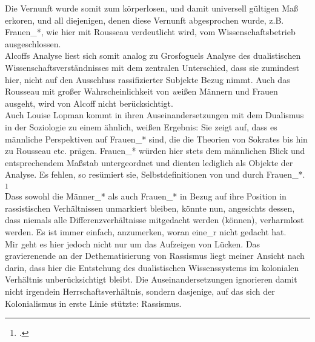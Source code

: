 Die Vernunft wurde somit zum körperlosen, und damit universell gültigen Maß
erkoren, und all diejenigen, denen diese Vernunft abgesprochen wurde, z.B.
Frauen\_*, wie hier mit Rousseau verdeutlicht wird, vom Wissenschaftsbetrieb
ausgeschlossen. \\
Alcoffs Analyse liest sich somit analog zu Grosfoguels Analyse
des dualistischen Wissenschaftsverständnisses mit dem zentralen Unterschied,
dass sie zumindest hier, nicht auf den Ausschluss rassifizierter Subjekte Bezug
nimmt. Auch das Rousseau mit großer Wahrscheinlichkeit von \textit{w}eißen Männern und
Frauen ausgeht, wird von Alcoff nicht berücksichtigt.\\ 

Auch Louise Lopman kommt in
ihren Auseinandersetzungen mit dem Dualismus in der Soziologie zu einem
ähnlich, weißen Ergebnis: Sie zeigt auf, dass es männliche Perspektiven auf
Frauen\_* sind, die die Theorien von Sokrates bis hin zu Rousseau etc. prägen.
Frauen\_* würden hier stets dem männlichen Blick und entsprechendem Maßstab
untergeordnet und dienten lediglich als Objekte der Analyse. Es fehlen, so
resümiert sie, Selbstdefinitionen von und durch Frauen\_*. \footnotemark
\footcitetext{lopman} \\
Dass sowohl die
Männer\_* als auch Frauen\_* in Bezug auf ihre Position in rassistischen
Verhältnissen unmarkiert bleiben, könnte nun, angesichts dessen, dass niemals
alle Differenzverhältnisse mitgedacht werden (können), verharmlost werden. Es
ist immer einfach, anzumerken, woran eine\_r nicht gedacht hat.\\

\noindent Mir geht es hier jedoch nicht nur um das Aufzeigen von Lücken. Das gravierenende an
der Dethematisierung von Rassismus liegt meiner Ansicht nach darin, dass hier
die Entstehung des dualistischen Wissenssystems im kolonialen Verhältnis
unberücksichtigt bleibt. Die Auseinandersetzungen ignorieren damit nicht
irgendein Herrschaftsverhältnis, sondern dasjenige, auf das sich der
Kolonialismus in erste Linie stützte: Rassismus.\\

